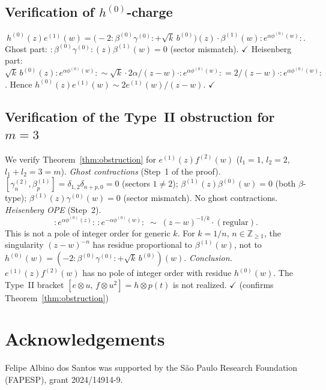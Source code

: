 \documentclass[12pt]{article}
\theoremstyle{plain}
\theoremstyle{definition}
\theoremstyle{remark}
\newcommand{\Z}{\mathbb{Z}}
\newcommand{\bl}[1]{\beta^{(#1)}}
\newcommand{\gl}[1]{\gamma^{(#1)}}
\newcommand{\el}[1]{e^{(#1)}}
\newcommand{\hl}[1]{h^{(#1)}}
\newcommand{\fl}[1]{f^{(#1)}}
\newcommand{\OPE}{\sim}
\newcommand{\no}[1]{:\!#1\!:}
\begin{document}
\subsection{Verification of \texorpdfstring{$h^{(0)}$}{h0}-charge}
\[
  \hl{0}(z)\el{1}(w)
  = \bigl(-2\no{\bl{0}\gl{0}}+\sqrt{k}\,b^{(0)}\bigr)(z)
    \cdot\bl{1}(w)\no{e^{\alpha\phi^{(0)}(w)}}.
\]
Ghost part: $\no{\bl{0}\gl{0}}(z)\bl{1}(w)=0$ (sector mismatch). $\checkmark$
Heisenberg part: $\sqrt{k}\,b^{(0)}(z)\no{e^{\alpha\phi^{(0)}(w)}}
\OPE \sqrt{k}\cdot 2\alpha/(z-w)\cdot\no{e^{\alpha\phi^{(0)}(w)}}
= 2/(z-w)\cdot\no{e^{\alpha\phi^{(0)}(w)}}$.
Hence $\hl{0}(z)\el{1}(w)\OPE 2\el{1}(w)/(z-w)$. $\checkmark$
\subsection{Verification of the Type~II obstruction for $m=3$}
We verify Theorem~\ref{thm:obstruction} for $\el{1}(z)\fl{2}(w)$ ($l_1=1$, $l_2=2$, $l_1+l_2=3=m$).
\emph{Ghost contractions} (Step~1 of the proof).
$[\gl{2}_n,\bl{1}_p]=\delta_{1,2}\delta_{n+p,0}=0$ (sectors $1\neq 2$);
$\bl{1}(z)\bl{0}(w)=0$ (both $\beta$-type);
$\bl{1}(z)\gl{0}(w)=0$ (sector mismatch).
No ghost contractions.
\emph{Heisenberg OPE} (Step~2).
\[
  \no{e^{\alpha\phi^{(0)}(z)}}\,\no{e^{-\alpha\phi^{(0)}(w)}}
  \;\OPE\;(z-w)^{-1/k}\cdot(\text{regular}).
\]
This is not a pole of integer order for generic $k$.
For $k=1/n$, $n\in\Z_{\geq 1}$, the singularity $(z-w)^{-n}$ has residue
proportional to $\bl{1}(w)$, not to $\hl{0}(w)=(-2\no{\bl{0}\gl{0}}+\sqrt{k}\,b^{(0)})(w)$.
\emph{Conclusion.}
$\el{1}(z)\fl{2}(w)$ has no pole of integer order with residue $\hl{0}(w)$.
The Type~II bracket $[e\otimes u,\,f\otimes u^2]=h\otimes p(t)$ is not
realized. $\checkmark$ (confirms Theorem~\ref{thm:obstruction})
\section*{Acknowledgements}
Felipe Albino dos Santos was supported by the S\~ao Paulo Research Foundation (FAPESP), grant 2024/14914-9.
\end{document}
